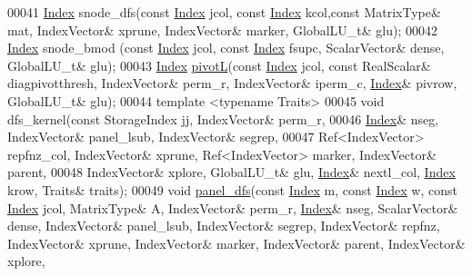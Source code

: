 \begin{DoxyCode}
00041      \hyperlink{namespace_eigen_a62e77e0933482dafde8fe197d9a2cfde}{Index} snode\_dfs(\textcolor{keyword}{const} \hyperlink{namespace_eigen_a62e77e0933482dafde8fe197d9a2cfde}{Index} jcol, \textcolor{keyword}{const} \hyperlink{namespace_eigen_a62e77e0933482dafde8fe197d9a2cfde}{Index} kcol,\textcolor{keyword}{const} MatrixType& mat,  IndexVector&
       xprune, IndexVector& marker, GlobalLU\_t& glu); 
00042      \hyperlink{namespace_eigen_a62e77e0933482dafde8fe197d9a2cfde}{Index} snode\_bmod (\textcolor{keyword}{const} \hyperlink{namespace_eigen_a62e77e0933482dafde8fe197d9a2cfde}{Index} jcol, \textcolor{keyword}{const} \hyperlink{namespace_eigen_a62e77e0933482dafde8fe197d9a2cfde}{Index} fsupc, ScalarVector& dense, GlobalLU\_t&
       glu);
00043      \hyperlink{namespace_eigen_a62e77e0933482dafde8fe197d9a2cfde}{Index} \hyperlink{group___sparse_l_u___module_ab5f56947465b829f8d523575724c3ac6}{pivotL}(\textcolor{keyword}{const} \hyperlink{namespace_eigen_a62e77e0933482dafde8fe197d9a2cfde}{Index} jcol, \textcolor{keyword}{const} RealScalar& diagpivotthresh, IndexVector& perm\_r,
       IndexVector& iperm\_c, \hyperlink{namespace_eigen_a62e77e0933482dafde8fe197d9a2cfde}{Index}& pivrow, GlobalLU\_t& glu);
00044      \textcolor{keyword}{template} <\textcolor{keyword}{typename} Traits>
00045      \textcolor{keywordtype}{void} dfs\_kernel(\textcolor{keyword}{const} StorageIndex jj, IndexVector& perm\_r,
00046                     \hyperlink{namespace_eigen_a62e77e0933482dafde8fe197d9a2cfde}{Index}& nseg, IndexVector& panel\_lsub, IndexVector& segrep,
00047                     Ref<IndexVector> repfnz\_col, IndexVector& xprune, Ref<IndexVector> marker, IndexVector&
       parent,
00048                     IndexVector& xplore, GlobalLU\_t& glu, \hyperlink{namespace_eigen_a62e77e0933482dafde8fe197d9a2cfde}{Index}& nextl\_col, 
      \hyperlink{namespace_eigen_a62e77e0933482dafde8fe197d9a2cfde}{Index} krow, Traits& traits);
00049      \textcolor{keywordtype}{void} \hyperlink{group___sparse_l_u___module_acaf62fda387ea03e9caa2734e4e7b0c9}{panel\_dfs}(\textcolor{keyword}{const} \hyperlink{namespace_eigen_a62e77e0933482dafde8fe197d9a2cfde}{Index} m, \textcolor{keyword}{const} \hyperlink{namespace_eigen_a62e77e0933482dafde8fe197d9a2cfde}{Index} w, \textcolor{keyword}{const} \hyperlink{namespace_eigen_a62e77e0933482dafde8fe197d9a2cfde}{Index} jcol, MatrixType& A, 
      IndexVector& perm\_r, \hyperlink{namespace_eigen_a62e77e0933482dafde8fe197d9a2cfde}{Index}& nseg, ScalarVector& dense, IndexVector& panel\_lsub, IndexVector& segrep, 
      IndexVector& repfnz, IndexVector& xprune, IndexVector& marker, IndexVector& parent, IndexVector& xplore, 

\end{DoxyCode}
